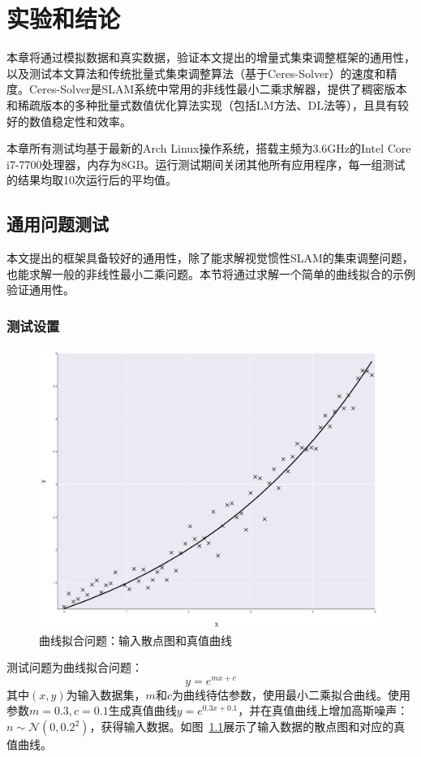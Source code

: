\chapter{实验和结论}\label{ch:exp}

本章将通过模拟数据和真实数据，验证本文提出的增量式集束调整框架的通用性，以及测试本文算法和传统批量式集束调整算法（基于Ceres-Solver）的速度和精度。Ceres-Solver是SLAM系统中常用的非线性最小二乘求解器，提供了稠密版本和稀疏版本的多种批量式数值优化算法实现（包括LM方法、DL法等），且具有较好的数值稳定性和效率。

本章所有测试均基于最新的Arch Linux操作系统，搭载主频为3.6GHz的Intel Core i7-7700处理器，内存为8GB。运行测试期间关闭其他所有应用程序，每一组测试的结果均取10次运行后的平均值。

\section{通用问题测试}

本文提出的框架具备较好的通用性，除了能求解视觉惯性SLAM的集束调整问题，也能求解一般的非线性最小二乘问题。本节将通过求解一个简单的曲线拟合的示例验证通用性。

\subsection{测试设置}

\begin{figure}[htb!]
    \centering
    \includegraphics[width=.7\textwidth]{Pictures/curse_fitting_gt.png}
    \caption{曲线拟合问题：输入散点图和真值曲线}
    \label{fig:curve_gt}
\end{figure}

测试问题为曲线拟合问题：
\begin{equation}
    y = e^{mx+c}
\end{equation}
其中$(x,y)$为输入数据集，$m$和$c$为曲线待估参数，使用最小二乘拟合曲线。使用参数$m=0.3,c=0.1$生成真值曲线$y=e^{0.3x+0.1}$，并在真值曲线上增加高斯噪声：$n\sim\mathcal{N}(0,0.2^2)$，获得输入数据。如图~\ref{fig:curve_gt}展示了输入数据的散点图和对应的真值曲线。

